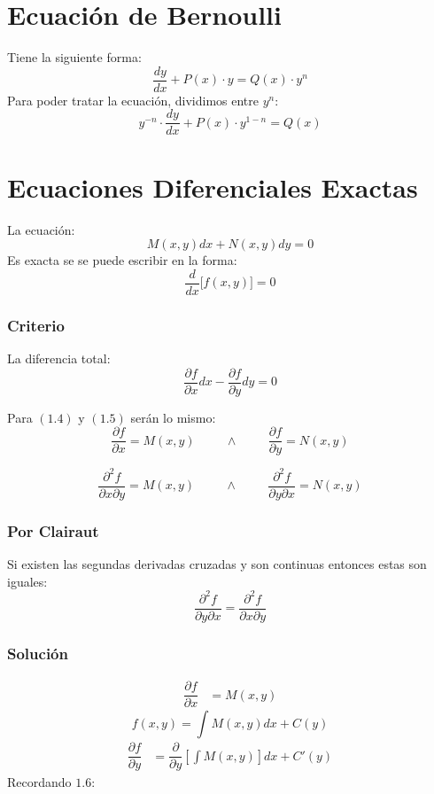 \section{Ecuación de Bernoulli}
Tiene la siguiente forma:
$$\dfrac{dy}{dx}+P(x)\cdot y =Q(x)\cdot y^n $$
Para poder tratar la ecuación, dividimos entre $y^n$:
$$y^{-n}\cdot\dfrac{dy}{dx}+P(x)\cdot y^{1-n} =Q(x)$$
\section{Ecuaciones Diferenciales Exactas}
La ecuación:
\begin{equation}
M(x,y)dx+N(x,y)dy=0
\end{equation}
Es exacta se se puede escribir en la forma:
$$\dfrac{d}{dx}\Big[ f(x,y) \Big] = 0$$
\subsubsection{Criterio}
La diferencia total:
\begin{equation}
\dfrac{\partial f}{\partial x}dx - \dfrac{\partial f}{\partial y}dy=0
\end{equation}

Para $(1\texttt{.}4)$ y $(1\texttt{.} 5)$ serán lo mismo:
\begin{equation}
\dfrac{\partial f}{\partial x}=M(x,y) \hspace{1cm} \wedge \hspace{1cm} \dfrac{\partial f}{\partial y}=N(x,y)
\end{equation}

$$\dfrac{\partial^2 f}{\partial x \partial y}=M(x,y) \hspace{1cm} \wedge \hspace{1cm} \dfrac{\partial^2 f}{\partial y\partial x}=N(x,y)$$
\subsubsection{Por Clairaut}
Si existen las segundas derivadas cruzadas y son continuas entonces estas son iguales:
$$\dfrac{\partial^2 f}{\partial y\partial x}=\dfrac{\partial^2 f}{\partial x\partial y}$$
\subsubsection{Solución}
\begin{align*}
\dfrac{\partial f}{\partial x} & = M(x,y)
\end{align*}
\begin{equation}
f(x,y)= \int M(x,y) dx + C(y)
\end{equation}
\begin{align*}
\dfrac{\partial f}{\partial y} & = \dfrac{\partial}{\partial y}\left[\int M(x,y)\right]  dx + C'(y) 
\end{align*}
Recordando $1\texttt{.}6$:
